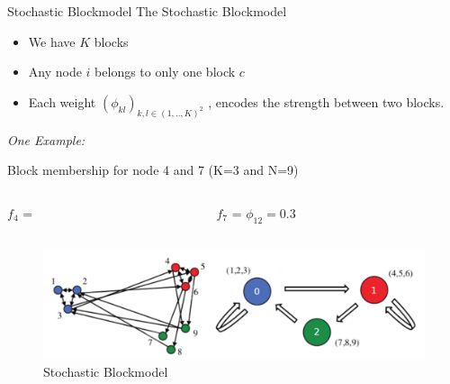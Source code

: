 \begin{frame}[t]{Stochastic Blockmodel}
    The Stochastic Blockmodel 

    \begin{itemize}
        \item We have $K$ blocks
        \item Any node $i$ belongs to only one block $c$
        \item Each weight $(\phi_{kl})_{k,l \in (1, .., K)^2}$ ,  encodes the strength between two blocks.
    \end{itemize}

    \vspace{1em}
    \emph{One Example:}

    \begin{block}{Block membership for node 4 and 7 (K=3 and N=9)}

    \begin{columns}[t]
        \begin{column}{0.45\textwidth}
        $f_4$ = \raisebox{-2pt}{}
        \end{column}
        \begin{column}{0.45\textwidth}
            \hspace{-1.5cm}
        $f_7$ = \raisebox{-2pt}{}
            \hspace{0.5cm}
        $\phi_{12} = 0.3$
        \end{column}
    \end{columns}

    \end{block}

    \begin{figure}[h]
    \includegraphics[scale=0.3]{img/sb}
        \caption{Stochastic Blockmodel}
    \end{figure}
    
\end{frame}

